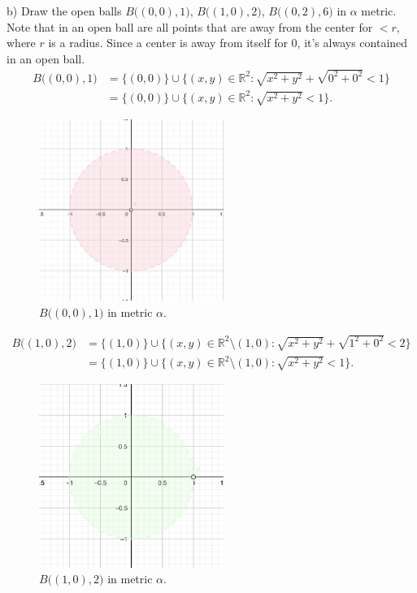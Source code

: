 \documentclass[a4paper,11pt]{article}
\begin{document}
\noindent
b) Draw the open balls $B \big((0, 0), 1 \big)$, $B \big((1, 0), 2 \big)$, $B \big((0, 2), 6 \big)$ in $\alpha$ metric. 
\\
Note that in an open ball are all points that are away from the center for $< r$, where $r$ is a radius. Since a center is away from itself for $0$, it's always contained in an open ball.
\begin{align*} 
    B \big((0, 0), 1 \big) &= \{(0,0)\} \cup \{(x,y) \in \mathbb{R}^2 : \sqrt{x^2 + y^2} + \sqrt{0^2 + 0^2}< 1 \} 
    \\
    &= \{(0,0)\} \cup \{(x,y) \in \mathbb{R}^2 : \sqrt{x^2 + y^2} < 1 \}. 
\end{align*}

\begin{figure}[ht!]
    \centering
    \includegraphics[width=60mm]{b1.png}
    \caption{$B \big((0, 0), 1 \big)$ in metric $\alpha$.}
\end{figure}


\begin{align*} 
    B \big((1, 0), 2 \big) &= \{(1,0)\} \cup \{(x,y) \in \mathbb{R}^2 \setminus (1,0) : \sqrt{x^2 + y^2} + \sqrt{1^2 + 0^2} < 2 \}
    \\
    &= \{(1,0)\} \cup \{(x,y) \in \mathbb{R}^2 \setminus (1,0) : \sqrt{x^2 + y^2} < 1 \} .
\end{align*}

\begin{figure}[ht!]
    \centering
    \includegraphics[width=60mm]{b2.png}
    \caption{$B \big((1, 0), 2 \big)$ in metric $\alpha$.}
\end{figure}
\end{document}
